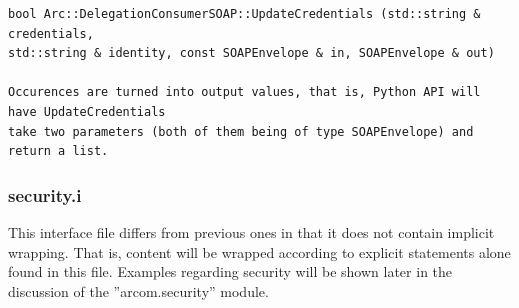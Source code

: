 \documentclass{article}
\begin{document}
\begin{flushleft}
\begin{itemize}
{\begin{example}
\begin{verbatim}
bool Arc::DelegationConsumerSOAP::UpdateCredentials (std::string & credentials,
std::string & identity, const SOAPEnvelope & in, SOAPEnvelope & out)

Occurences are turned into output values, that is, Python API will have UpdateCredentials 
take two parameters (both of them being of type SOAPEnvelope) and return a list.
\end{verbatim}
    \end{example}
  }
\end{itemize}
\end{flushleft}

\subsubsection{security.i}
This interface file differs from previous ones in that it does not contain implicit wrapping. 
That is, content will be wrapped according to explicit statements alone found in this file.
Examples regarding security will be shown later in the discussion of the ''arcom.security'' module.
\end{document}
